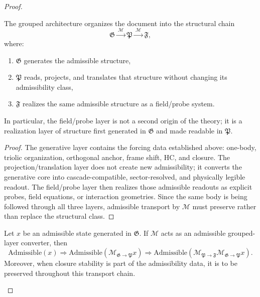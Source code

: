 \begin{proof}
\begin{proposition}
\label{prop:grouped-forcing-readout-chain}
The grouped architecture organizes the document into the structural chain
\[
\mathfrak G \xrightarrow{\ \mathcal M\ } \mathfrak P
\xrightarrow{\ \mathcal M\ } \mathfrak F,
\]
where:
\begin{enumerate}[leftmargin=2em,label=(\alph*)]
\item $\mathfrak G$ generates the admissible structure,
\item $\mathfrak P$ reads, projects, and translates that structure without changing
its admissibility class,
\item $\mathfrak F$ realizes the same admissible structure as a field/probe system.
\end{enumerate}
In particular, the field/probe layer is not a second origin of the theory; it
is a realization layer of structure first generated in $\mathfrak G$ and made
readable in $\mathfrak P$.
\end{proposition}

\begin{proof}
The generative layer contains the forcing data established above: one-body,
triolic organization, orthogonal anchor, frame shift, HC, and closure. The
projection/translation layer does not create new admissibility; it converts the
generative core into cascade-compatible, sector-resolved, and physically
legible readout. The field/probe layer then realizes those admissible readouts
as explicit probes, field equations, or interaction geometries. Since the same
body is being followed through all three layers, admissible transport by
$\mathcal M$ must preserve rather than replace the structural class.
\end{proof}

\begin{proposition}
\label{prop:admissibility-preservation-grouped-layers}
Let $x$ be an admissible state generated in $\mathfrak G$. If $\mathcal M$ acts as
an admissible grouped-layer converter, then
\[
\mathrm{Admissible}(x)
\Longrightarrow
\mathrm{Admissible}(\mathcal M_{\mathfrak G\to\mathfrak P}x)
\Longrightarrow
\mathrm{Admissible}(\mathcal M_{\mathfrak P\to\mathfrak F}\mathcal M_{\mathfrak G\to\mathfrak P}x).
\]
Moreover, when closure stability is part of the admissibility data, it is to be
preserved throughout this transport chain.
\end{proposition}


\end{proof}
